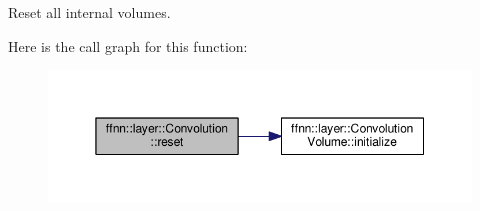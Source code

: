 Reset all internal volumes. 



Here is the call graph for this function\-:\nopagebreak
\begin{figure}[H]
\begin{center}
\leavevmode
\includegraphics[width=350pt]{classffnn_1_1layer_1_1_convolution_aba90ab5ad018485361b1723e29d01354_cgraph}
\end{center}
\end{figure}


